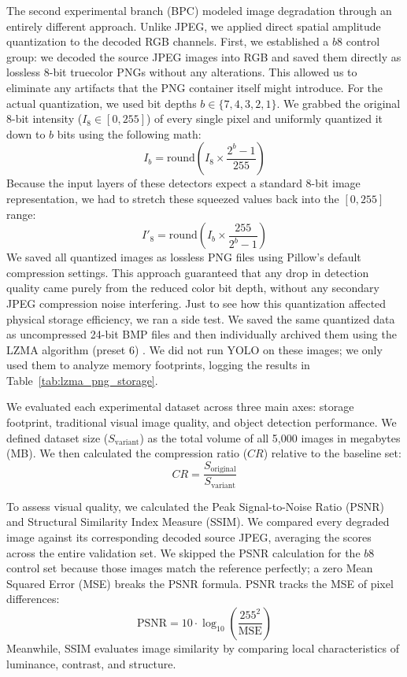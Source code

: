 \documentclass[12pt, a4paper]{article}
\begin{document}
The second experimental branch (BPC) modeled image degradation through an entirely different approach. Unlike JPEG, we applied direct spatial amplitude quantization to the decoded RGB channels. First, we established a $b8$ control group: we decoded the source JPEG images into RGB and saved them directly as lossless 8-bit truecolor PNGs without any alterations. This allowed us to eliminate any artifacts that the PNG container itself might introduce. For the actual quantization, we used bit depths $b \in \{7, 4, 3, 2, 1\}$. We grabbed the original 8-bit intensity ($I_{8} \in [0, 255]$) of every single pixel and uniformly quantized it down to $b$ bits using the following math:
\begin{equation}
I_{b} = \text{round}\left(I_{8} \times \frac{2^b - 1}{255}\right)
\label{eq:quant}
\end{equation}
Because the input layers of these detectors expect a standard 8-bit image representation, we had to stretch these squeezed values back into the $[0, 255]$ range:
\begin{equation}
I'_{8} = \text{round}\left(I_{b} \times \frac{255}{2^b - 1}\right)
\label{eq:dequant}
\end{equation}
We saved all quantized images as lossless PNG files using Pillow's default compression settings. This approach guaranteed that any drop in detection quality came purely from the reduced color bit depth, without any secondary JPEG compression noise interfering. Just to see how this quantization affected physical storage efficiency, we ran a side test. We saved the same quantized data as uncompressed 24-bit BMP files and then individually archived them using the LZMA algorithm (preset 6) \cite{pavlov2013}. We did not run YOLO on these images; we only used them to analyze memory footprints, logging the results in Table~\ref{tab:lzma_png_storage}.

We evaluated each experimental dataset across three main axes: storage footprint, traditional visual image quality, and object detection performance. We defined dataset size ($S_{\text{variant}}$) as the total volume of all 5,000 images in megabytes (MB). We then calculated the compression ratio ($CR$) relative to the baseline set:
\begin{equation}
CR = \frac{S_{\text{original}}}{S_{\text{variant}}}
\label{eq:cr}
\end{equation}

To assess visual quality, we calculated the Peak Signal-to-Noise Ratio (PSNR) and Structural Similarity Index Measure (SSIM). We compared every degraded image against its corresponding decoded source JPEG, averaging the scores across the entire validation set. We skipped the PSNR calculation for the $b8$ control set because those images match the reference perfectly; a zero Mean Squared Error (MSE) breaks the PSNR formula. PSNR tracks the MSE of pixel differences:
\begin{equation}
\text{PSNR} = 10 \cdot \log_{10}\left(\frac{255^2}{\text{MSE}}\right)
\label{eq:psnr}
\end{equation}
Meanwhile, SSIM \cite{wang2004} evaluates image similarity by comparing local characteristics of luminance, contrast, and structure.
\end{document}
